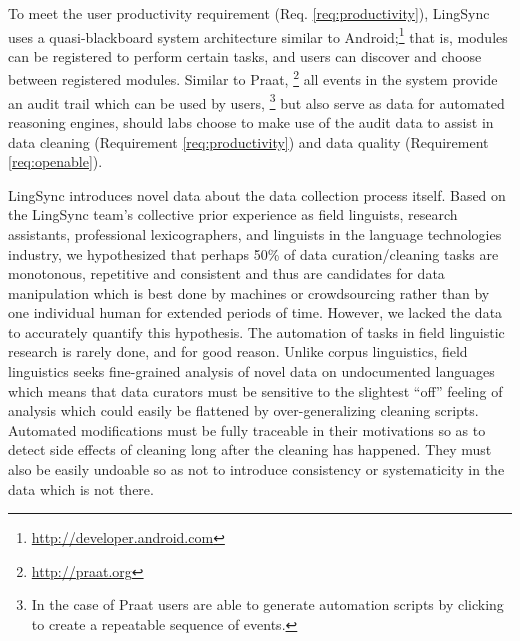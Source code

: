 \documentclass[11pt]{article}
\begin{document}
To meet the user productivity requirement (Req. \autoref{req:productivity}),
LingSync uses a quasi-blackboard system architecture similar to
Android;\footnote{\url{http://developer.android.com}} that is, modules can be
registered to perform certain tasks, and users can discover and choose between
registered modules. Similar to Praat,%
\footnote{\url{http://praat.org}} %
all events in the system provide an audit trail which can be used by users,%
\footnote{In the case of Praat users are able to generate automation scripts by
clicking to create a repeatable sequence of events.}
but also serve as data for automated reasoning engines, should labs choose to
make use of the audit data to assist in data cleaning (Requirement
\autoref{req:productivity}) and data quality (Requirement
\autoref{req:openable}).

LingSync introduces novel data about the data collection process itself. 
Based on the LingSync team's collective prior experience as field linguists,
research assistants, professional lexicographers, and linguists in the language
technologies industry, we hypothesized that perhaps 50\% of data
curation/cleaning tasks are monotonous, repetitive and consistent and thus are
candidates for data manipulation which is best done by machines or
crowdsourcing rather than by one individual human for extended periods of time.
However, we lacked the data to accurately quantify this hypothesis.  The
automation of tasks in field linguistic research is rarely done, and for good
reason. Unlike corpus linguistics, field linguistics seeks fine-grained
analysis of novel data on undocumented languages which means that data curators
must be sensitive to the slightest ``off'' feeling of analysis which could
easily be flattened by over-generalizing cleaning scripts.  Automated
modifications must be fully traceable in their motivations so as to detect side
effects of cleaning long after the cleaning has happened. They must also be
easily undoable so as not to introduce consistency or systematicity in the data
which is not there. 
\end{document}
